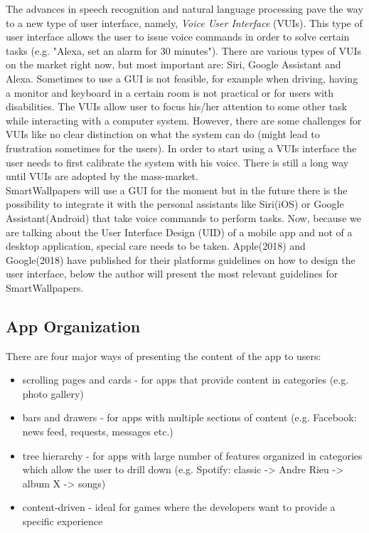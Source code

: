 \documentclass[]{article}
\begin{document}
	\indent
	The advances in speech recognition and natural language processing pave the way to  a new type of user interface, namely, \textit{Voice User Interface} (VUIs). This type of user interface allows the user to issue voice commands in order to solve certain tasks (e.g. "Alexa, set an alarm for 30 minutes"). There are various types of VUIs on the market right now, but most important are: Siri, Google Assistant and Alexa. Sometimes to use a GUI is not feasible, for example when driving, having a monitor and keyboard in a certain room is not practical or for users with disabilities. The  VUIs allow user to focus his/her attention to some other task while interacting with a computer system. However, there are some challenges for VUIs like no clear distinction on what the system can do (might lead to frustration sometimes for the users). In order to start using a VUIs interface the user needs to first calibrate the system with his voice. There is still a long way until VUIs are adopted by the mass-market.\\

	\indent
	SmartWallpapers will use a GUI for the moment but in the future there is the possibility to integrate it with the personal assistants like Siri(iOS) or Google Assistant(Android) that take voice commands to perform tasks. Now, because we are talking about the User Interface Design (UID) of a mobile app and not of a desktop application, special care needs to be taken. Apple(2018) and Google(2018) have published for their platforms guidelines on how to design the user interface, below the author will present the most relevant guidelines for SmartWallpapers.

\subsection{App Organization}
	There are four major ways of presenting the content of the app to users: 
		\begin{itemize}
			
			\item scrolling pages and cards - for apps that provide content in categories (e.g. photo gallery)

			\item bars and drawers -  for apps with multiple sections of content (e.g. Facebook: news feed, requests, messages etc.)

			\item tree hierarchy - for apps with large number of features organized in categories which allow the user to drill down (e.g. Spotify: classic -> Andre Rieu -> album X -> songs)

			\item content-driven - ideal for games where the developers want to provide a specific experience 

		\end{itemize}
\end{document}
